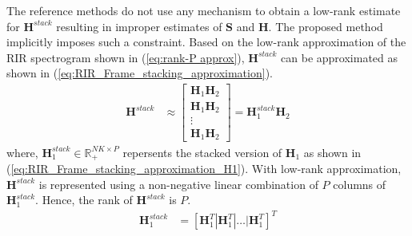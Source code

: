 The reference methods do not use any mechanism to obtain a low-rank estimate for $\mathbf{H}^{stack}$ resulting in improper estimates of $\mathbf{S}$ and $\mathbf{H}$. The proposed method implicitly imposes such a constraint. Based on the low-rank approximation of the RIR spectrogram shown in (\ref{eq:rank-P approx}), $\mathbf{H}^{stack}$ can be approximated as shown in (\ref{eq:RIR_Frame_stacking_approximation}). 
\begin{align}
\mathbf{H}^{stack} &\approx \begin{bmatrix}
\mathbf{H}_1 \mathbf{H}_2 \\
\mathbf{H}_1 \mathbf{H}_2 \\
\vdots \\
\mathbf{H}_1 \mathbf{H}_2
\end{bmatrix}
= \mathbf{H}^{stack}_1\mathbf{H}_2
\label{eq:RIR_Frame_stacking_approximation}
\end{align}
where, $\mathbf{H}^{stack}_1\in \mathbb{R}_+^{NK \times P}$ repersents the stacked version of $\mathbf{H}_1$ as shown in (\ref{eq:RIR_Frame_stacking_approximation_H1}). With low-rank approximation, $\mathbf{H}^{stack}$ is represented using a non-negative linear combination of $P$ columns of $\mathbf{H}_1^{stack}$. Hence, the rank of $\mathbf{H}^{stack}$ is $P$.
\begin{align}
\mathbf{H}^{stack}_1 &= [\mathbf{H}_1^T |\mathbf{H}_1^T | \dots | \mathbf{H}_1^T]^T 
\label{eq:RIR_Frame_stacking_approximation_H1}
\end{align}

